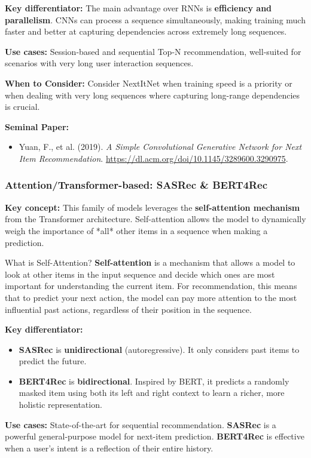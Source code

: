 \documentclass{article}
\begin{document}
\noindent\textbf{Key differentiator:} The main advantage over RNNs is \textbf{efficiency and parallelism}. CNNs can process a sequence simultaneously, making training much faster and better at capturing dependencies across extremely long sequences.

\noindent\textbf{Use cases:} Session-based and sequential Top-N recommendation, well-suited for scenarios with very long user interaction sequences.

\noindent\textbf{When to Consider:} Consider NextItNet when training speed is a priority or when dealing with very long sequences where capturing long-range dependencies is crucial.

\noindent\textbf{Seminal Paper:}
    \begin{itemize}
        \item Yuan, F., et al. (2019). \textit{A Simple Convolutional Generative Network for Next Item Recommendation}. \url{https://dl.acm.org/doi/10.1145/3289600.3290975}.
    \end{itemize}

    \subsubsection{Attention/Transformer-based: SASRec \& BERT4Rec}
\noindent\textbf{Key concept:} This family of models leverages the \textbf{self-attention mechanism} from the Transformer architecture. Self-attention allows the model to dynamically weigh the importance of *all* other items in a sequence when making a prediction.
    
    \begin{asidebox}{What is Self-Attention?}
\noindent\textbf{Self-attention} is a mechanism that allows a model to look at other items in the input sequence and decide which ones are most important for understanding the current item. For recommendation, this means that to predict your next action, the model can pay more attention to the most influential past actions, regardless of their position in the sequence.
    \end{asidebox}

\noindent\textbf{Key differentiator:}
    \begin{itemize}
        \item \textbf{SASRec} is \textbf{unidirectional} (autoregressive). It only considers past items to predict the future.
        \item \textbf{BERT4Rec} is \textbf{bidirectional}. Inspired by BERT, it predicts a randomly masked item using both its left and right context to learn a richer, more holistic representation.
    \end{itemize}
\noindent\textbf{Use cases:} State-of-the-art for sequential recommendation. \textbf{SASRec} is a powerful general-purpose model for next-item prediction. \textbf{BERT4Rec} is effective when a user's intent is a reflection of their entire history.
\end{document}
